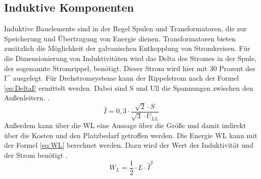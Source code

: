 		\subsection{Induktive Komponenten}
		Induktive Bauelemente sind in der Regel Spulen und Transformatoren, die zur Speicherung und Übertragung von Energie dienen. Transformatoren bieten zusätzlich die Möglichkeit der galvanischen Entkopplung von Stromkreisen. 
		Für die Dimensionierung von Induktivitäten wird das Delta des Stromes in der Spule, der sogenannte Stromrippel, benötigt. Dieser Strom wird hier mit 30 Prozent des \gls{I^} ausgelegt. Für Drehstromsysteme kann der Rippelstrom nach der Formel \ref{eq:DeltaI} ermittelt werden. Dabei sind \gls{S} und \gls{Ull} die Spannungen zwischen den Außenleitern. \cite{Boge.2007}.\\
		\begin{equation}
			\label{eq:DeltaI}
			\hat{I} = 0,3 \cdot \dfrac{\sqrt{2} \cdot S}{\sqrt{3} \cdot U_{LL}}
		\end{equation}
		Außerdem kann über die \gls{WL} eine Aussage über die Größe und damit indirekt über die Kosten und den Platzbedarf getroffen werden. Die Energie \gls{WL} kann mit der Formel \ref{eq:WL} berechnet werden. Dazu wird der Wert der Induktivität und der Strom benötigt \cite{Boge.2007}.
		\begin{equation}
			\label{eq:WL}
			W_{L} =\dfrac{1}{2}\cdot L\cdot \hat{I}^{2}
		\end{equation}
				
			
